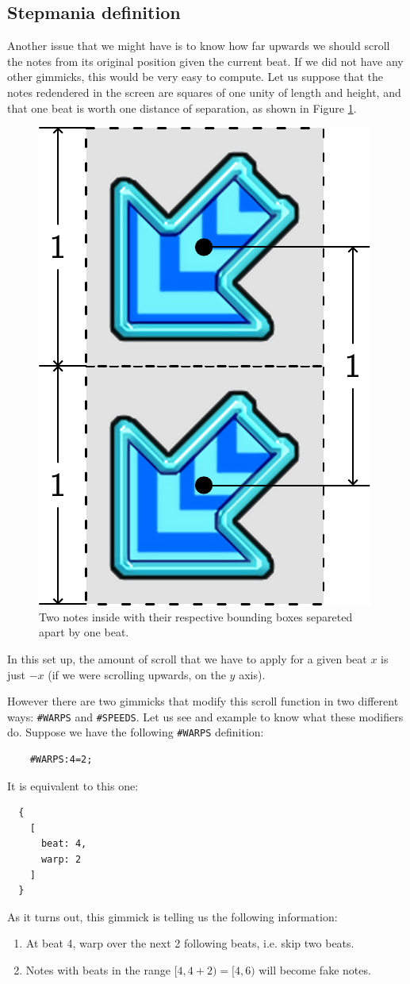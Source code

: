 \documentclass[a4paper,9pt]{article}
\begin{document}
    \subsection{Stepmania definition}
    Another issue that we might have is to know how far upwards we should scroll the notes from its original position given the current beat. If we did not have any other gimmicks, this would be very easy to compute. Let us suppose that the notes redendered in the screen are squares of one unity of length and height, and that one beat is worth one distance of separation, as shown in Figure \ref{fig:notes-layout}.
    \begin{figure}[htpb]
	    \centering
	    \includegraphics[width=0.3\linewidth]{beat2scroll}
	    \caption{Two notes inside with their respective bounding boxes separeted apart by one beat.}
	    \label{fig:notes-layout}
    \end{figure}
    In this set up, the amount of scroll that we have to apply for a given beat $ x $ is just $ -x $ (if we were scrolling upwards, on the $y$ axis).

	    However there are two gimmicks that modify this scroll function in two different ways: \texttt{\#WARPS} and \texttt{\#SPEEDS}. Let us see and example to know what these modifiers do. Suppose we have the following \texttt{\#WARPS} definition:
    \begin{verbatim}
    #WARPS:4=2;     
    \end{verbatim}
    It is equivalent to this one:
    \begin{verbatim}
  {
    [
      beat: 4,
      warp: 2
    ]
  }
    \end{verbatim}
    As it turns out, this gimmick is telling us the following information:
    \begin{enumerate}
	    \item At beat 4, warp over the next 2 following beats, i.e. skip two beats.
	    \item Notes with beats in the range $ [4, 4+2) = [4,6) $ will become fake notes.
    \end{enumerate}
    
\end{document}

